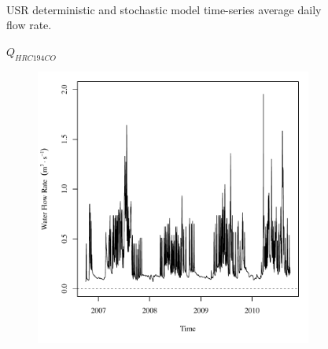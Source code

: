 \begin{linenumbers}
\begin{landscape}
\begin{figure}
\begin{subfigure}{0.7\textwidth}
		\end{subfigure}\\
		\caption{USR deterministic and stochastic model time-series average daily flow rate.}
	\end{figure}
\end{landscape}
\subfiguremid
\begin{landscape}
	\begin{figure}
		\centering
		$ Q_{HRC194CO} $
		\begin{subfigure}{0.7\textwidth}
			\centering
			\includegraphics[width=\tableCustomSize]{"Figures/Results_USR/Deterministic/Q HRC"}
		\end{subfigure}%
		\begin{subfigure}{0.7\textwidth}
			\centering

\end{subfigure}
\end{figure}
\end{landscape}
\end{linenumbers}
